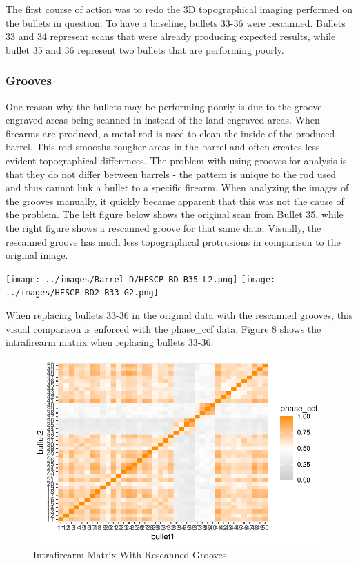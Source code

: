 \documentclass[
  number]{elsarticle}
\begin{document}
The first course of action was to redo the 3D topographical imaging
performed on the bullets in question. To have a baseline, bullets 33-36
were rescanned. Bullets 33 and 34 represent scans that were already
producing expected results, while bullet 35 and 36 represent two bullets
that are performing poorly.

\hypertarget{grooves}{%
\subsubsection{Grooves}\label{grooves}}

One reason why the bullets may be performing poorly is due to the
groove-engraved areas being scanned in instead of the land-engraved
areas. When firearms are produced, a metal rod is used to clean the
inside of the produced barrel. This rod smooths rougher areas in the
barrel and often creates less evident topographical differences. The
problem with using grooves for analysis is that they do not differ
between barrels - the pattern is unique to the rod used and thus cannot
link a bullet to a specific firearm. When analyzing the images of the
grooves manually, it quickly became apparent that this was not the cause
of the problem. The left figure below shows the original scan from
Bullet 35, while the right figure shows a rescanned groove for that same
data. Visually, the rescanned groove has much less topographical
protrusions in comparison to the original image.

\texttt{[image: ../images/Barrel D/HFSCP-BD-B35-L2.png]}
\texttt{[image: ../images/HFSCP-BD2-B33-G2.png]}

When replacing bullets 33-36 in the original data with the rescanned
grooves, this visual comparison is enforced with the phase\_ccf data.
Figure 8 shows the intrafirearm matrix when replacing bullets 33-36.

\begin{figure}[H]

{\centering \includegraphics{Interactive-Visualization-Framework_files/figure-pdf/unnamed-chunk-4-1.pdf}

}

\caption{Intrafirearm Matrix With Rescanned Grooves}

\end{figure}
\end{document}
